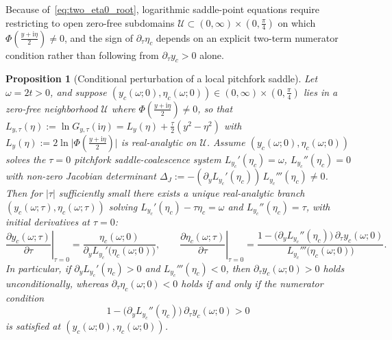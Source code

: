 \documentclass[11pt,reqno]{amsart}
\theoremstyle{plain}
\newtheorem{proposition}[theorem]{Proposition}
\theoremstyle{definition}
\theoremstyle{remark}
\numberwithin{equation}{section}
\newcommand{\ii}{\mathrm{i}}
\begin{document}
Because of~\eqref{eq:two_eta0_root}, logarithmic saddle-point equations require restricting to open zero-free subdomains $\mathcal{U} \subset (0,\infty) \times (0, \frac{\pi}{4})$ on which $\Phi(\frac{y + \ii\eta}{2}) \neq 0$, and the sign of $\partial_\tau\eta_c$ depends on an explicit two-term numerator condition rather than following from $\partial_\tau y_c > 0$ alone.

\begin{proposition}[Conditional perturbation of a local pitchfork saddle]\label{prop:conditional_saddle}
Let $\omega = 2t > 0$, and suppose $(y_c(\omega; 0), \eta_c(\omega; 0)) \in (0,\infty) \times (0, \frac{\pi}{4})$ lies in a zero-free neighborhood $\mathcal{U}$ where $\Phi(\frac{y + \ii\eta}{2}) \neq 0$, so that $L_{y,\tau}(\eta) := \ln G_{y,\tau}(\ii\eta) = L_y(\eta) + \frac{\tau}{2}(y^2 - \eta^2)$ with $L_y(\eta) := 2\ln\lvert\Phi(\frac{y + \ii\eta}{2})\rvert$ is real-analytic on $\mathcal{U}$. Assume $(y_c(\omega; 0), \eta_c(\omega; 0))$ solves the $\tau = 0$ pitchfork saddle-coalescence system $L_{y_c}'(\eta_c) = \omega$, $L_{y_c}''(\eta_c) = 0$ with non-zero Jacobian determinant $\Delta_J := -(\partial_y L_{y_c}'(\eta_c))\,L_{y_c}'''(\eta_c) \neq 0$. Then for $\lvert\tau\rvert$ sufficiently small there exists a unique real-analytic branch $(y_c(\omega;\tau), \eta_c(\omega;\tau))$ solving $L_{y_c}'(\eta_c) - \tau\eta_c = \omega$ and $L_{y_c}''(\eta_c) = \tau$, with initial derivatives at $\tau = 0$:
\begin{equation}\label{eq:saddle_velocities}
\left.\frac{\partial y_c(\omega;\tau)}{\partial\tau}\right|_{\tau=0} = \frac{\eta_c(\omega; 0)}{\partial_y L_{y_c}'\bigl(\eta_c(\omega; 0)\bigr)}, \qquad \left.\frac{\partial\eta_c(\omega;\tau)}{\partial\tau}\right|_{\tau=0} = \frac{1 - \bigl(\partial_y L_{y_c}''(\eta_c)\bigr)\,\partial_\tau y_c(\omega; 0)}{L_{y_c}'''\bigl(\eta_c(\omega; 0)\bigr)}.
\end{equation}
In particular, if $\partial_y L_{y_c}'(\eta_c) > 0$ and $L_{y_c}'''(\eta_c) < 0$, then $\partial_\tau y_c(\omega; 0) > 0$ holds unconditionally, whereas $\partial_\tau\eta_c(\omega; 0) < 0$ holds \emph{if and only if} the numerator condition
\begin{equation}\label{eq:numerator_condition}
1 - \bigl(\partial_y L_{y_c}''(\eta_c)\bigr)\,\partial_\tau y_c(\omega; 0) > 0
\end{equation}
is satisfied at $(y_c(\omega; 0), \eta_c(\omega; 0))$.
\end{proposition}
\end{document}

